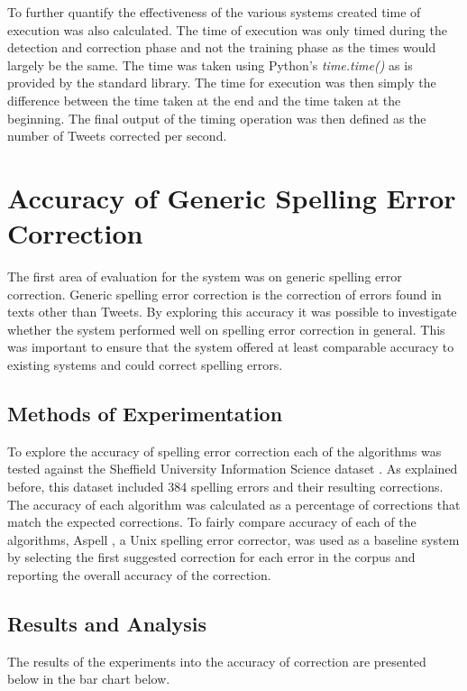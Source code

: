 To further quantify the effectiveness of the various systems created time of execution was also calculated. The time of execution was only timed during the detection and correction phase and not the training phase as the times would largely be the same. The time was taken using Python's \emph{time.time()} \cite{} as is provided by the standard library. The time for execution was then simply the difference between the time taken at the end and the time taken at the beginning. The final output of the timing operation was then defined as the number of Tweets corrected per second.

\section{Accuracy of Generic Spelling Error Correction}
The first area of evaluation for the system was on generic spelling error correction. Generic spelling error correction is the correction of errors found in texts other than Tweets. By exploring this accuracy it was possible to investigate whether the system performed well on spelling error correction in general. This was important to ensure that the system offered at least comparable accuracy to existing systems and could correct spelling errors.

\subsection{Methods of Experimentation}
To explore the accuracy of spelling error correction each of the algorithms was tested against the Sheffield University Information Science dataset \cite{}. As explained before, this dataset included 384 spelling errors and their resulting corrections. The accuracy of each algorithm was calculated as a percentage of corrections that match the expected corrections. To fairly compare accuracy of each of the algorithms, Aspell \cite{}, a Unix spelling error corrector, was used as a baseline system by selecting the first suggested correction for each error in the corpus and reporting the overall accuracy of the correction.

\subsection{Results and Analysis}
The results of the experiments into the accuracy of correction are presented below in the bar chart below.


